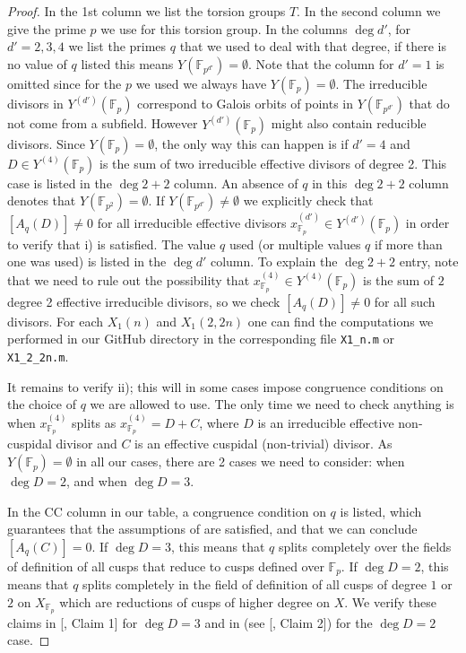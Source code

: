 \documentclass[11pt,reqno]{amsart}
\theoremstyle{definition}
\numberwithin{equation}{section}
\newcommand{\F}{\mathbb{F}}
\newcommand{\githubbare}[1]{\href{https://github.com/nt-lib/quartic-torsion/blob/main/#1}{\path{#1}}}
\newcommand{\github}[2]{[\githubbare{#1}, #2]}
\begin{document}
\begin{proof}
In the 1st column we list the torsion groups $T$. In the second column we give the prime $p$ we use for this torsion group. In the columns $\deg d'$, for $d'=2,3,4$ we list the primes $q$ that we used to deal with that degree, if there is no value of $q$ listed this means $Y(\F_{p^{d'}})=\emptyset$. Note that  the column for $d'=1$ is omitted since for the $p$ we used we always have $Y(\F_{p})=\emptyset$. The irreducible divisors in $Y^{(d')}(\F_p)$ correspond to Galois orbits of points in $Y(\F_{p^{d'}})$ that do not come from a subfield. However $Y^{(d')}(\F_p)$ might also contain reducible divisors. Since $Y(\F_{p})=\emptyset$, the only way this can happen is if $d'=4$ and $D \in Y^{(4)}(\F_p)$ is the sum of two irreducible effective divisors of degree 2. This case is listed in the $\deg 2+2$ column. An absence of $q$ in this $\deg 2+2$ column denotes that $Y(\F_{p^2})=\emptyset$. If $Y(\F_{p^{d'}}) \neq \emptyset$ we explicitly check that $[A_q(D)]\neq 0$ for all irreducible effective divisors $x^{(d')}_{\F_p}\in Y^{(d')}(\F_p)$ in order to verify that  i) is satisfied. The value $q$ used  (or multiple values $q$ if more than one was used) is listed in the $\deg d'$ column. To explain the $\deg 2+2$ entry, note that we need to rule out the possibility that $x^{(4)}_{\F_p}\in Y^{(4)}(\F_p)$ is the sum of $2$ degree 2 effective irreducible divisors, so we check $[A_q(D)]\neq 0$ for all such divisors. For each $X_1(n)$ and $X_1(2,2n)$ one can find the computations we performed in our GitHub directory in the corresponding file \verb|X1_n.m| or \verb|X1_2_2n.m|.

It remains to verify  ii); this will in some cases impose congruence conditions on the choice of $q$ we are allowed to use. The only time we need to check anything is when $x^{(4)}_{\F_p}$ splits as $x^{(4)}_{\F_p}=D+C$, where $D$ is an irreducible effective non-cuspidal divisor and $C$ is an effective cuspidal (non-trivial) divisor. As $Y(\F_p)=\emptyset$ in all our cases, there are 2 cases we need to consider: when $\deg D=2$, and when $\deg D=3$. 

In the CC column in our table, a congruence condition on $q$ is listed, which guarantees that the assumptions of  are satisfied, and that we can conclude $[A_q(C)]=0$. If $\deg D=3$, this means that $q$ splits completely over the fields of definition of all cusps that reduce to cusps defined over $\F_p$. If $\deg D=2$, this means that $q$ splits completely in the field of definition of all cusps of degree $1$ or $2$ on $X_{\F_p}$ which are reductions of cusps of higher degree on $X$. We verify these claims in \github{congreuence_checks.m}{Claim 1} for $\deg D=3$ and in (see \github{congreuence_checks.m}{Claim 2}) for the $\deg D=2$ case.


\end{proof}
\end{document}
